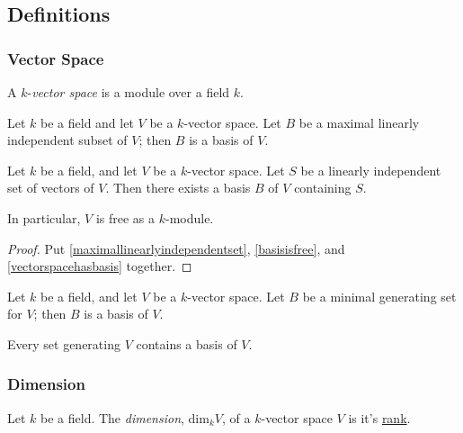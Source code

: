 \subsection{Definitions}

\subsubsection{Vector Space}\label{vectorspace}
A $k$-\emph{vector space} is a module over a field $k$.

\begin{lemma}
\label{vectorspacehasbasis}
Let $k$ be a field and let $V$ be a $k$-vector space. Let $B$ be a maximal linearly independent
subset of $V$; then $B$ is a basis of $V$.
\end{lemma}

\begin{proposition}
Let $k$ be a field, and let $V$ be a $k$-vector space. Let $S$ be a linearly independent set of vectors of $V$.
Then there exists a basis $B$ of $V$ containing $S$.

In particular, $V$ is free as a $k$-module.
\end{proposition}

\begin{proof}
Put \ref{maximallinearlyindependentset}, \ref{basisisfree}, and \ref{vectorspacehasbasis} together.
\end{proof}

\begin{lemma}
Let $k$ be a field, and let $V$ be a $k$-vector space. Let $B$ be a minimal generating set for $V$; then $B$ is a basis
of $V$.

Every set generating $V$ contains a basis of $V$.
\end{lemma}

\subsubsection{Dimension}\label{dimentions}
Let $k$ be a field. The \emph{dimension}, dim$_k V$, of a $k$-vector space $V$ is it's \hyperref[rank]{rank}.